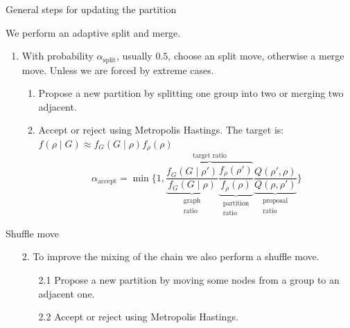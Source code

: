 \begin{frame}{General steps for updating the partition}
    
    We perform an adaptive \alert{split and merge}.

    \begin{enumerate}
        \item With probability $\alpha_{\text{split}}$, usually $0.5$, choose an \alert{split move}, otherwise a \alert{merge move}. Unless we are forced by extreme cases.
        \begin{enumerate}
            \item Propose a new partition by splitting one group into two or merging two adjacent.
            \item Accept or reject using\vphantom{un banale} Metropolis Hastings. The target is:
            $f(\rho \mid G) \approx f_G(G \mid \rho) f_{\rho}(\rho)$
            \[
                \alpha_{\text{accept}} = \min
                \bigg\{1,
                \overbrace{
                \underbrace{\frac{f_G\left(G \mid \rho'\right)}{f_G(G \mid \rho)}}_{\substack{\text{graph}\\\text{ratio}}}
                \underbrace{\frac{f_\rho\left(\rho'\right)}{f_\rho(\rho)}}_{\substack{\text{partition}\\\text{ratio}}}
                }^{\text{target ratio}}
                \underbrace{\frac{Q(\rho',\rho)}{Q(\rho,\rho')}}_{\substack{\text{proposal}\\\text{ratio}}}
                \bigg\}
            \]
        \end{enumerate}
        
    \end{enumerate}

\end{frame}

\begin{frame}{Shuffle move}
    \begin{enumerate}
        \item[2.] To improve the mixing of the chain we also perform a \alert{shuffle move}.
            \begin{enumerate}
                \item[2.1] Propose a new partition by moving some nodes from a group to an adjacent one.
                \item[2.2] Accept or reject using Metropolis Hastings.
            \end{enumerate}
    \end{enumerate}

\end{frame}


